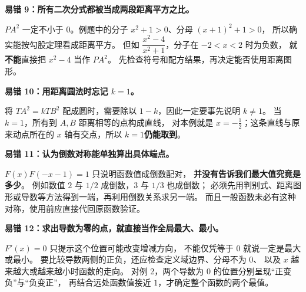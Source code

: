 \clearpage
\begin{trapbox}
\textbf{\textcolor{CTrap}{易错 9：所有二次分式都被当成两段距离平方之比。}}

$PA^2$ 一定不小于 $0$。例题中的分子 $x^2+1>0$、分母 $(x+1)^2+1>0$，
所以确实能按勾股定理看成距离平方。
但如 $\dfrac{x^2-4}{x^2+1}$，分子在 $-2<x<2$ 时为负数，
就\textbf{不能}直接把 $x^2-4$ 当作 $PA^2$。
先检查符号和配方结果，再决定能否使用距离图形。
\end{trapbox}

\clearpage
\begin{trapbox}
\textbf{\textcolor{CTrap}{易错 10：用距离圆法时忘记 $k=1$。}}

将 $TA^2=kTB^2$ 配成圆时，需要除以 $1-k$，因此一定要事先说明 $k\ne1$。
当 $k=1$，所有到 $A,B$ 距离相等的点构成直线，
对本例就是 $x=-\frac12$；这条直线与原来动点所在的 $x$ 轴有交点，所以 $k=1$\textbf{仍能取到}。
\end{trapbox}

\clearpage
\begin{trapbox}
\textbf{\textcolor{CTrap}{易错 11：认为倒数对称能单独算出具体端点。}}

$F(x)F(-x-1)=1$ 只说明函数值成倒数配对，
\textbf{并没有告诉我们最大值究竟是多少}。
例如数值 $2$ 与 $1/2$ 成倒数，$3$ 与 $1/3$ 也成倒数；
必须先用判别式、距离图形或导数等方法得到一端，再利用倒数关系求另一端。
而且一般函数未必有这种对称，使用前应直接代回原函数验证。
\end{trapbox}

\clearpage
\begin{trapbox}
\textbf{\textcolor{CTrap}{易错 12：求出导数为零的点，就直接当作全局最大、最小。}}

$F'(x)=0$ 只提示这个位置可能改变增减方向，
不能仅凭等于 $0$ 就说一定是最大或最小。
要比较导数两侧的正负，还应检查定义域边界、分母不为 $0$、
以及 $x$ 越来越大或越来越小时函数的走向。
对例 2，两个导数为 $0$ 的位置分别呈现“正变负”与“负变正”，
再结合远处函数值接近 $1$，才确定整个函数的两个最值。
\end{trapbox}
